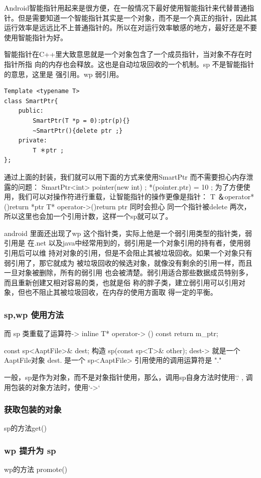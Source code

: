 \documentclass[a4paper,11pt]{article}
\begin{document}
Android智能指针用起来是很方便，在一般情况下最好使用智能指针来代替普通指针。但是需要知道一个智能指针其实是一个对象，而不是一个真正的指针，因此其运行效率是远远比不上普通指针的。所以在对运行效率敏感的地方，最好还是不要使用智能指针为好。

智能指针在C++里大致意思就是一个对象包含了一个成员指针，当对象不存在时指针所指
向的内存也会释放。这也是自动垃圾回收的一个机制。sp 不是智能指针的意思，这里是
强引用。wp 弱引用。

\begin{lstlisting}
Template <typename T>
class SmartPtr{
    public:
        SmartPtr(T *p = 0):ptr(p){}
        ~SmartPtr(){delete ptr ;}
    private:
        T ＊ptr ;
};
\end{lstlisting}
通过上面的封装，我们就可以用下面的方式来使用SmartPtr 而不需要担心内存泄露的问题：
SmartPtr<int> pointer(new int) ;
*(pointer.ptr) = 10 ;
为了方便使用，我们可以对操作符进行重载，让智能指针的操作更像是指针：
T ＆operator*(){return *ptr}
T* operator->(){return ptr}
同时会担心 同一个指针被delete 两次，所以这里也会加一个引用计数，这样一个sp就可以了。


android 里面还出现了wp 这个指针类，实际上他是一个弱引用类型的指针类，弱引用是
在.net 以及java中经常用到的，弱引用是一个对象引用的持有者，使用弱引用后可以维
持对对象的引用，但是不会阻止其被垃圾回收。如果一个对象只有弱引用了，那它就成为
被垃圾回收的候选对象，就像没有剩余的引用一样，而且一旦对象被删除，所有的弱引用
也会被清楚。弱引用适合那些数据成员特别多，而且重新创建又相对容易的类，也就是俗
称的胖子类，建立弱引用可以引用对象，但也不阻止其被垃圾回收，在内存的使用方面取
得一定的平衡。

\subsubsection{sp,wp 使用方法}
而 sp 类重载了运算符-> 
    inline  T*      operator-> () const { return m_ptr;  }

const sp<AaptFile>\& dest;  构造   sp(const sp<T>\& other);
dest-> 就是一个AaptFile对象
dest.  是一个 sp<AaptFile>
引用使用的调用运算符是 "."

一般，sp是作为对象，而不是对象指针使用，那么，调用sp自身方法时使用`.` ,
调用包装的对象方法时，使用`->`

\subsubsection{获取包装的对象} 
sp的方法get()

\subsubsection{wp 提升为 sp}
wp的方法 promote()
\end{document}
